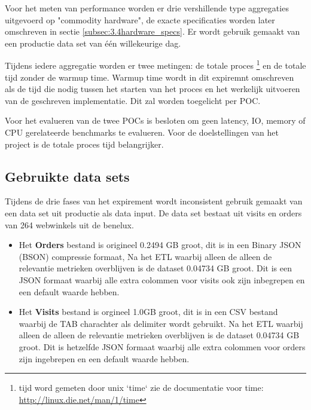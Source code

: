 Voor het meten van performance worden er drie vershillende type aggregaties uitgevoerd op "commodity hardware", de exacte specificaties worden later omschreven in sectie \ref{subsec:3.4hardware_specs}.  Er wordt gebruik gemaakt van een productie data set van één willekeurige dag.

Tijdens iedere aggregatie worden er twee metingen: de totale proces \footnote{tijd word gemeten door unix `time` zie de documentatie voor time: \url{http://linux.die.net/man/1/time}} en de totale tijd zonder de warmup time.  Warmup time wordt in dit expiremnt omschreven als de tijd die nodig tussen het starten van het proces en het werkelijk uitvoeren van de geschreven implementatie. Dit zal worden toegelicht per POC.

Voor het evalueren van de twee POCs is besloten om geen latency, IO, memory of CPU gerelateerde benchmarks te evalueren.
Voor de doelstellingen van het project is de totale proces tijd belangrijker.


\subsection{Gebruikte data sets}

Tijdens de drie fases van het expirement wordt inconsistent gebruik gemaakt van een data set uit productie als data input. De data set bestaat uit visits en orders van 264 webwinkels uit de benelux.

\begin{itemize}
    \item Het \textbf{Orders} bestand is origineel 0.2494 GB groot, dit is in een Binary JSON (BSON) compressie formaat, Na het ETL waarbij alleen de alleen de relevantie metrieken overblijven is de dataset 0.04734 GB groot. Dit is een JSON formaat waarbij alle extra colommen voor visits ook zijn inbegrepen en een default waarde hebben.

    \item Het \textbf{Visits} bestand is orgineel 1.0GB groot, dit is in een CSV bestand waarbij de TAB charachter als delimiter wordt gebruikt.  Na het ETL waarbij alleen de alleen de relevantie metrieken overblijven is de dataset 0.04734 GB groot. Dit is hetzelfde JSON formaat waarbij alle extra colommen voor orders zijn ingebrepen en een default waarde hebben.
\end{itemize}

